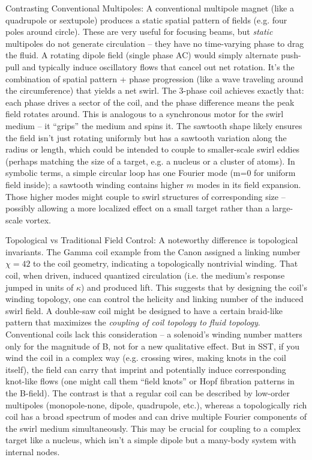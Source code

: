 \documentclass[11pt]{article}
\begin{document}
Contrasting Conventional Multipoles: A conventional multipole magnet (like a quadrupole or sextupole) produces a static spatial pattern of fields (e.g. four poles around circle). These are very useful for focusing beams, but \textit{static} multipoles do not generate circulation – they have no time-varying phase to drag the fluid. A rotating dipole field (single phase AC) would simply alternate push-pull and typically induce oscillatory flows that cancel out net rotation. It’s the combination of spatial pattern + phase progression (like a wave traveling around the circumference) that yields a net swirl. The 3-phase coil achieves exactly that: each phase drives a sector of the coil, and the phase difference means the peak field rotates around. This is analogous to a synchronous motor for the swirl medium – it “grips” the medium and spins it. The sawtooth shape likely ensures the field isn’t just rotating uniformly but has a sawtooth variation along the radius or length, which could be intended to couple to smaller-scale swirl eddies (perhaps matching the size of a target, e.g. a nucleus or a cluster of atoms). In symbolic terms, a simple circular loop has one Fourier mode (m=0 for uniform field inside); a sawtooth winding contains higher $m$ modes in its field expansion. Those higher modes might couple to swirl structures of corresponding size – possibly allowing a more localized effect on a small target rather than a large-scale vortex.


Topological vs Traditional Field Control: A noteworthy difference is topological invariants. The Gamma coil example from the Canon assigned a linking number $\chi=42$ to the coil geometry, indicating a topologically nontrivial winding. That coil, when driven, induced quantized circulation (i.e. the medium’s response jumped in units of $\kappa$) and produced lift. This suggests that by designing the coil’s winding topology, one can control the helicity and linking number of the induced swirl field. A double-saw coil might be designed to have a certain braid-like pattern that maximizes the \textit{coupling of coil topology to fluid topology}. Conventional coils lack this consideration – a solenoid’s winding number matters only for the magnitude of B, not for a new qualitative effect. But in SST, if you wind the coil in a complex way (e.g. crossing wires, making knots in the coil itself), the field can carry that imprint and potentially induce corresponding knot-like flows (one might call them “field knots” or Hopf fibration patterns in the B-field). The contrast is that a regular coil can be described by low-order multipoles (monopole-none, dipole, quadrupole, etc.), whereas a topologically rich coil has a broad spectrum of modes and can drive multiple Fourier components of the swirl medium simultaneously. This may be crucial for coupling to a complex target like a nucleus, which isn’t a simple dipole but a many-body system with internal nodes.
\end{document}

